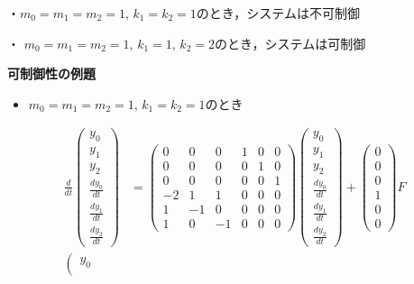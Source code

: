 \documentclass[a4paper,11pt]{jreport}
\begin{document}
・$m_0=m_1=m_2=1$, $k_1=k_2=1$のとき，システムは不可制御

・ $m_0=m_1=m_2=1$, $k_1=1$, $k_2=2$のとき，システムは可制御


\newpage
\noindent
{\bf 可制御性の例題}
\begin{itemize}
\item $m_0=m_1=m_2=1$, $k_1=k_2=1$のとき
\end{itemize}

\begin{align}
 \frac{d}{dt} \left(\begin{array}{c}
	         y_0 \\
		     y_1 \\
		     y_2 \\
		     \frac{dy_0}{dt} \\
		     \frac{dy_1}{dt} \\
		     \frac{dy_2}{dt}
		    \end{array}\right)
 &=
 \left(\begin{array}{rrrrrr}
        0 & 0 & 0 & 1 & 0 & 0      \\
        0 & 0 & 0 & 0 & 1 & 0      \\
        0 & 0 & 0 & 0 & 0 & 1      \\
	-2& 1 & 1 & 0 & 0 & 0 \\
	1 & -1& 0 & 0 & 0 & 0 \\
	1 & 0 & -1& 0 & 0 & 0 
       \end{array}\right)
 \left(\begin{array}{c}
	         y_0 \\
		     y_1 \\
		     y_2 \\
		     \frac{dy_0}{dt} \\
		     \frac{dy_1}{dt} \\
		     \frac{dy_2}{dt}
       \end{array}\right)
 +
 \left(\begin{array}{c}
        0 \\
        0 \\
        0 \\
	    1 \\
	    0 \\
	    0 
       \end{array}\right)
        F
\nonumber
\\
 \left(\begin{array}{c}
	    y_0 \\

\end{array}
\end{align}
\end{document}
